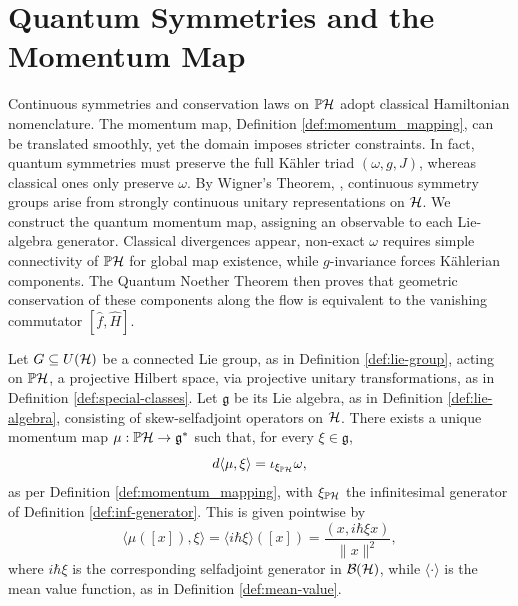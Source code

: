 \section{Quantum Symmetries and the Momentum Map}
\label{sec:quantum-momentum-map}

Continuous symmetries and conservation laws on $\PH$ adopt classical Hamiltonian nomenclature. The momentum map, Definition \ref{def:momentum_mapping}, can be translated smoothly, yet the domain imposes stricter constraints. In fact, quantum symmetries must preserve the full Kähler triad $(\omega,g,J)$, whereas classical ones only preserve $\omega$. By Wigner's Theorem, \cite[Theorem 12.11]{morettiSpectralTheoryQuantum}, continuous symmetry groups arise from strongly continuous unitary representations on $\H$. We construct the quantum momentum map, assigning an observable to each Lie-algebra generator. Classical divergences appear, non-exact $\omega$ requires simple connectivity of $\PH$ for global map existence, while $g$-invariance forces Kählerian components. The Quantum Noether Theorem then proves that geometric conservation of these components along the flow is equivalent to the vanishing commutator $[\hat{f},\hat{H}]$.

\begin{proposition}
	\label{prop:quantum-momentum-map}
	Let $G \subseteq U(\H)$ be a connected Lie group, as in Definition \ref{def:lie-group}, acting on $\PH$, a projective Hilbert space, via projective unitary transformations, as in Definition \ref{def:special-classes}. Let $\mathfrak{g}$ be its Lie algebra, as in Definition \ref{def:lie-algebra}, consisting of skew-selfadjoint operators on $\H$. There exists a unique momentum map $\mu: \PH \to \mathfrak{g}^*$ such that, for every $\xi\in\mathfrak g$, $$d\langle \mu, \xi \rangle = \iota_{\xi_{\PH}} \omega,$$ as per Definition \ref{def:momentum_mapping}, with $\xi_{\PH}$ the infinitesimal generator of Definition \ref{def:inf-generator}. This is given pointwise by
	\begin{equation}
		\langle \mu([x]), \xi \rangle = \langle i\hbar \xi \rangle([x]) = \frac{(x, i\hbar \xi x)}{\|x\|^2},
	\end{equation}
	where $i\hbar \xi$ is the corresponding selfadjoint generator in $\BH$, while $\langle \cdot \rangle$ is the mean value function, as in Definition \ref{def:mean-value}.
\end{proposition}

